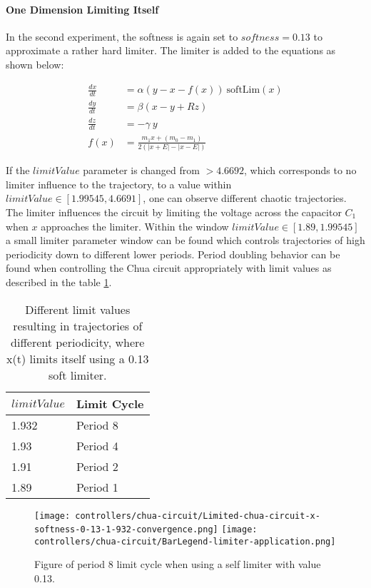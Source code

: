 \documentclass[main]{subfiles}
\begin{document}
\paragraph{One Dimension Limiting Itself} In the second experiment, the softness is again set to \(softness=0.13\) to approximate a rather hard limiter. The limiter is added to the equations as shown below:

\begin{align*}
\frac{dx}{dt}&=\alpha (y-x-f(x)) ~ \text{softLim}(x)\\
\frac{dy}{dt}&=\beta (x-y + Rz)\\
\frac{dz}{dt}&=-\gamma ~ y\\
f (x) &= \frac{m_1 x + (m_0 - m_1)}{2 (| x + E | -| x - E |)}
\end{align*}

If the $limitValue$ parameter is changed from \(>4.6692\), which corresponds to no limiter influence to the trajectory, to a value within \(limitValue \in [1.99545,4.6691]\), one can observe different chaotic trajectories. The limiter influences the circuit by limiting the voltage across the capacitor \(C_1\) when \(x\) approaches the limiter. %
%
Within the window \(limitValue \in [1.89,1.99545]\) a small limiter parameter window can be found which controls trajectories of high periodicity down to different lower periods. %
%
Period doubling behavior can be found when controlling the Chua circuit appropriately with limit values as described in the table \ref{table:x-0.13-periodicities}.

\begin{table}[H]
\renewcommand{\arraystretch}{1.2}
\center
\begin{tabular}{@{}ll@{}}
	\toprule
   \(limitValue\) & Limit Cycle\\
   \midrule
   1.932 & Period 8 \\ 
   1.93 & Period 4 \\
   1.91  & Period 2 \\
   1.89 & Period 1 \\
   \bottomrule
\end{tabular}
\caption[Limiter values for periodic trajectories for an x self-limiting limiter with softness 0.13]{Different limit values resulting in trajectories of different periodicity, where x(t) limits itself using a 0.13 soft limiter.}
\label{table:x-0.13-periodicities}
\end{table}

\begin{figure}[H]
\centering
\texttt{[image: controllers/chua-circuit/Limited-chua-circuit-x-softness-0-13-1-932-convergence.png]}
\texttt{[image: controllers/chua-circuit/BarLegend-limiter-application.png]}
\caption[Figure of period 8 limit cycle using self limiting 0.13 soft limiter]{Figure of period 8 limit cycle when using a self limiter with value 0.13.}
\label{figure:x-0.13-8-limit-cycle-trajectory}
\end{figure}
\end{document}
